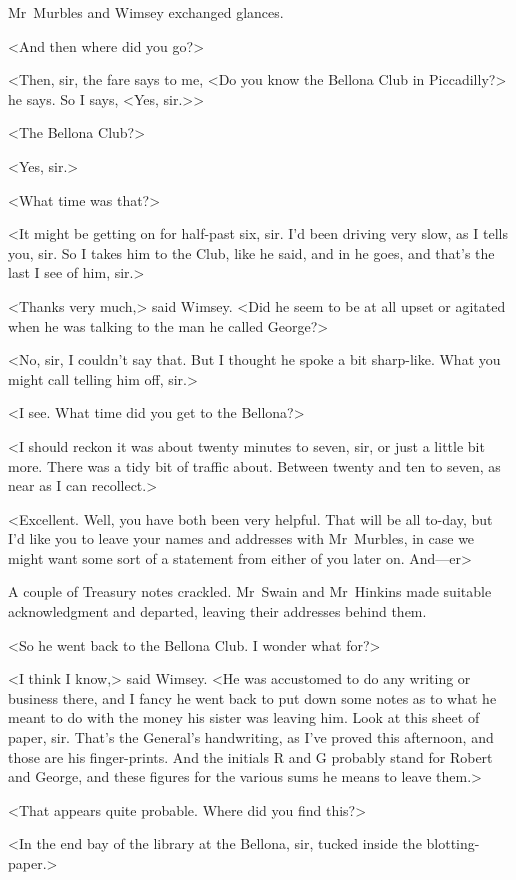 Mr~Murbles and Wimsey exchanged glances.

<And then where did you go?>

<Then, sir, the fare says to me, <Do you know the Bellona Club in Piccadilly?> he says. So I says, <Yes, sir.>>

<The Bellona Club?>

<Yes, sir.>

<What time was that?>

<It might be getting on for half-past six, sir. I'd been driving very slow, as I tells you, sir. So I takes him to the Club, like he said, and in he goes, and that's the last I see of him, sir.>

<Thanks very much,> said Wimsey. <Did he seem to be at all upset or agitated when he was talking to the man he called George?>

<No, sir, I couldn't say that. But I thought he spoke a bit sharp-like. What you might call telling him off, sir.>

<I see. What time did you get to the Bellona?>

<I should reckon it was about twenty minutes to seven, sir, or just a little bit more. There was a tidy bit of traffic about. Between twenty and ten to seven, as near as I can recollect.>

<Excellent. Well, you have both been very helpful. That will be all to-day, but I'd like you to leave your names and addresses with Mr~Murbles, in case we might want some sort of a statement from either of you later on. And—er\longdash>

A couple of Treasury notes crackled. Mr~Swain and Mr~Hinkins made suitable acknowledgment and departed, leaving their addresses behind them.

<So he went back to the Bellona Club. I wonder what for?>

<I think I know,> said Wimsey. <He was accustomed to do any writing or business there, and I fancy he went back to put down some notes as to what he meant to do with the money his sister was leaving him. Look at this sheet of paper, sir. That's the General's handwriting, as I've proved this afternoon, and those are his finger-prints. And the initials R and G probably stand for Robert and George, and these figures for the various sums he means to leave them.>

<That appears quite probable. Where did you find this?>

<In the end bay of the library at the Bellona, sir, tucked inside the blotting-paper.>

